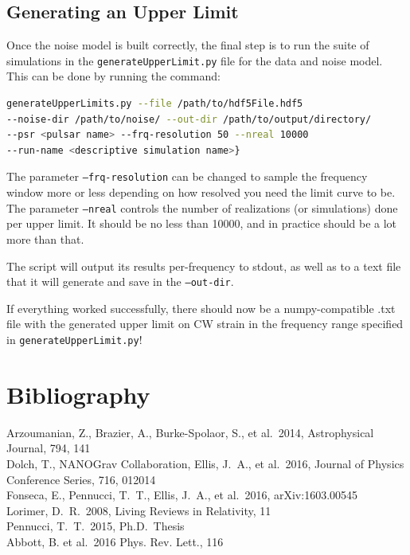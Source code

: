\documentclass[12pt]{article}
\begin{document}
\subsection{Generating an Upper Limit}

Once the noise model is built correctly, the final step is to run the suite of
simulations in the \texttt{generateUpperLimit.py} file for the data and noise model. This
can be done by running the command:
\\
\begin{lstlisting}[language=bash]
generateUpperLimits.py --file /path/to/hdf5File.hdf5
--noise-dir /path/to/noise/ --out-dir /path/to/output/directory/
--psr <pulsar name> --frq-resolution 50 --nreal 10000
--run-name <descriptive simulation name>}
\end{lstlisting}

The parameter \texttt{--frq-resolution} can be changed to sample the frequency window
more or less depending on how resolved you need the limit curve to be. The
parameter \texttt{--nreal} controls the number of realizations (or simulations) done per
upper limit. It should be no less than 10000, and in practice should be a lot
more than that.

The script will output its results per-frequency to stdout, as well as to a text
file that it will generate and save in the \texttt{--out-dir}. 

If everything worked successfully, there should now be a numpy-compatible .txt
file with the generated upper limit on CW strain in the frequency range
specified in \texttt{generateUpperLimit.py}!

\newpage
\section{Bibliography}
\noindent Arzoumanian, Z., Brazier, A., Burke-Spolaor, S., et al.\ 2014,
Astrophysical Journal, 794, 141
\\
\newline\noindent Dolch, T., NANOGrav Collaboration, Ellis, J.~A., et al.\ 2016,
Journal of Physics Conference Series, 716, 012014
\\
\newline\noindent Fonseca, E., Pennucci, T.~T., Ellis, J.~A., et al.\ 2016, arXiv:1603.00545 
\\
\newline\noindent Lorimer, D.~R.\ 2008, Living Reviews in Relativity, 11
\\
\newline\noindent Pennucci, T.~T.\ 2015, Ph.D.~Thesis
\\
\newline\noindent Abbott, B. et al.\ 2016 Phys. Rev. Lett., 116
\end{document}
